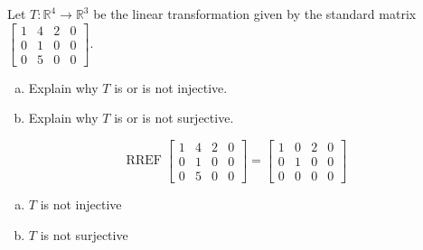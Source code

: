 
\begin{exerciseStatement}
 Let \(T:\mathbb{R}^ 4  \to \mathbb{R}^ 3 \) be the linear transformation given by the standard matrix \( \left[\begin{array}{cccc}
1 & 4 & 2 & 0 \\
0 & 1 & 0 & 0 \\
0 & 5 & 0 & 0
\end{array}\right] .\)
\begin{enumerate}[(a)]
\item Explain why \(T\) is or is not injective.
\item Explain why \(T\) is or is not surjective.
\end{enumerate}
    
\end{exerciseStatement}
    
\begin{exerciseAnswer} 


\[\operatorname{RREF} \left[\begin{array}{cccc}
1 & 4 & 2 & 0 \\
0 & 1 & 0 & 0 \\
0 & 5 & 0 & 0
\end{array}\right] = \left[\begin{array}{cccc}
1 & 0 & 2 & 0 \\
0 & 1 & 0 & 0 \\
0 & 0 & 0 & 0
\end{array}\right] \]


\begin{enumerate}[(a)]
\item \(T\) is not injective
\item \(T\) is not surjective
\end{enumerate}
    
\end{exerciseAnswer}
    
